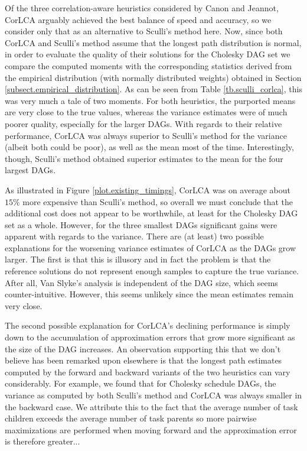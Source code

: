 \documentclass[12pt]{article}
\begin{document}
      Of the three correlation-aware heuristics considered by Canon and Jeannot, CorLCA arguably achieved the best balance of speed and accuracy, so we consider only that as an alternative to Sculli's method here. Now, since both CorLCA and Sculli's method assume that the longest path distribution is normal, in order to evaluate the quality of their solutions for the Cholesky DAG set we compare the computed moments with the corresponding statistics derived from the empirical distribution (with normally distributed weights) obtained in Section \ref{subsect.empirical_distribution}. As can be seen from Table \ref{tb.sculli_corlca}, this was very much a tale of two moments. For both heuristics, the purported means are very close to the true values, whereas the variance estimates were of much poorer quality, especially for the larger DAGs. With regards to their relative performance, CorLCA was always superior to Sculli's method for the variance (albeit both could be poor), as well as the mean most of the time. Interestingly, though, Sculli's method obtained superior estimates to the mean for the four largest DAGs.

      As illustrated in Figure \ref{plot.existing_timings}, CorLCA was on average about $15\%$ more expensive than Sculli's method, so overall we must conclude that the additional cost does not appear to be worthwhile, at least for the Cholesky DAG set as a whole. However, for the three smallest DAGs significant gains were apparent with regards to the variance. There are (at least) two possible explanations for the worsening variance estimates of CorLCA as the DAGs grow larger. The first is that this is illusory and in fact the problem is that the reference solutions do not represent enough samples to capture the true variance. After all, Van Slyke's analysis is independent of the DAG size, which seems counter-intuitive. However, this seems unlikely since the mean estimates remain very close.

      The second possible explanation for CorLCA's declining performance is simply down to the accumulation of approximation errors that grow more significant as the size of the DAG increases. An observation supporting this that we don't believe has been remarked upon elsewhere is that the longest path estimates computed by the forward and backward variants of the two heuristics can vary considerably. For example, we found that for Cholesky schedule DAGs, the variance as computed by both Sculli's method and CorLCA was always smaller in the backward case. We attribute this to the fact that the average number of task children exceeds the average number of task parents so more pairwise maximizations are performed when moving forward and the approximation error is therefore greater...   
\end{document}
